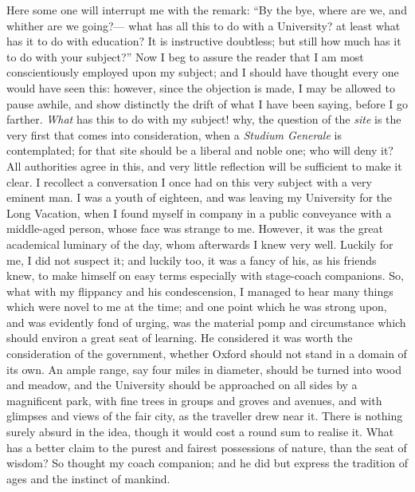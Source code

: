 Here some one will interrupt me with the remark: ``By the bye,
where are we, and whither are we going?— what has all this to
do with a University? at least what has it to do with education? It is
instructive doubtless; but still how much has it to do with your
subject?'' Now I beg to assure the reader that I am most
conscientiously employed upon my subject; and I should have thought
every one would have seen this: however, since the objection is made,
I may be allowed to pause awhile, and show distinctly the drift of
what I have been saying, before I go farther. \emph{What} has this to
do with my subject! why, the question of the \emph{site} is the very
first that comes into consideration, when a \emph{Studium Generale} is
contemplated; for that site should be a liberal and noble one; who
will deny it? All authorities agree in this, and very little
reflection will be sufficient to make it clear. I recollect a
conversation I once had on this very subject with a very eminent man.
I was a youth of eighteen, and was leaving my University for the Long
Vacation, when I found myself in company in a public conveyance with a
middle-aged person, whose face was strange to me. However, it was the
great academical luminary of the day, whom afterwards I knew very
well. Luckily for me, I did not suspect it; and luckily too, it was a
fancy of his, as his friends knew, to make himself on easy terms
especially with stage-coach companions. So, what with my flippancy and
his condescension, I managed to hear many things which were novel to
me at the time; and one point which he was strong upon, and was
evidently fond of urging, was the material pomp and circumstance which
should environ a great seat of learning. He considered it was worth
the consideration of the government, whether Oxford should not stand
in a domain of its own. An ample range, say four miles in diameter,
should be turned into wood and meadow, and the University should be
approached on all sides by a magnificent park, with fine trees in
groups and groves and avenues, and with glimpses and views of the fair
city, as the traveller drew near it. There is nothing surely absurd in
the idea, though it would cost a round sum to realise it. What has a
better claim to the purest and fairest possessions of nature, than the
seat of wisdom? So thought my coach companion; and he did but express
the tradition of ages and the instinct of mankind.

